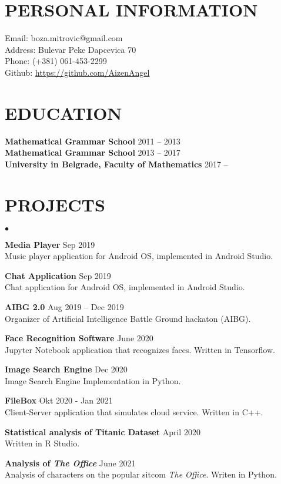\documentclass[margin,center]{res}
\newenvironment{list2}{
  \begin{list}{$\bullet$}{%
      \setlength{\itemsep}{0in}
      \setlength{\parsep}{0in} \setlength{\parskip}{0in}
      \setlength{\topsep}{0in} \setlength{\partopsep}{0in}
      \setlength{\leftmargin}{0.2in}}}{\end{list}}
\begin{document}


\begin{resume}
\section{PERSONAL INFORMATION}
{ Email:    }   boza.mitrovic@gmail.com  \\ 
{ Address:} Bulevar Peke Dapcevica 70   \\  
{ Phone: }(+381) 061-453-2299  \\ 
{ Github: } \url{https://github.com/AizenAngel}


\section{EDUCATION}
{\bf Mathematical Grammar School} \hfill 2011 -- 2013\\
{\bf Mathematical Grammar School} \hfill 2013 -- 2017\\
{\bf University in Belgrade, Faculty of Mathematics}  \hfill 2017 -- 


\section{PROJECTS\\}
\begin{list2}
  \item{\bf Media Player} \hfill  Sep 2019\\
    Music player application for Android OS, implemented in Android Studio.
  \item{\bf Chat Application} \hfill Sep 2019\\
    Chat application for Android OS, implemented in Android Studio.
  \item{\bf AIBG 2.0} \hfill Aug 2019 -- Dec 2019 \\ 
    Organizer of Artificial Intelligence Battle Ground hackaton (AIBG).
  \item{\bf Face Recognition Software} \hfill June 2020\\
    Jupyter Notebook application that recognizes faces. Written in Tensorflow.
  \item{\bf Image Search Engine} \hfill Dec 2020 \\
    Image Search Engine Implementation in Python.
  \item{\bf FileBox}  \hfill Okt 2020 - Jan 2021\\
    Client-Server application that simulates cloud service. Written in C++.
  \item{\bf Statistical analysis of Titanic Dataset} \hfill April 2020\\
    Written in R Studio.
  \item{\bf Analysis of \emph{The Office}} \hfill June 2021 \\
    Analysis of characters on the popular sitcom \emph{The Office}. Writen in Python.


\end{list2}
\end{resume}
\end{document}
